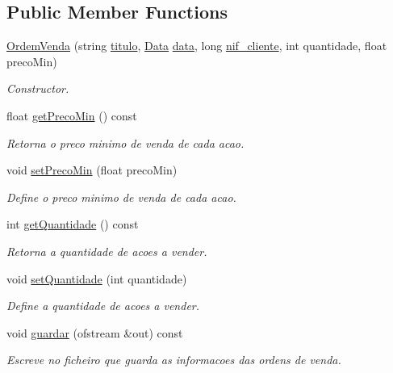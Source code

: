 \subsection*{Public Member Functions}
\begin{DoxyCompactItemize}
\item 
\hyperlink{class_ordem_venda_a90290893a4a714fa7e1b15801a00a452}{Ordem\+Venda} (string \hyperlink{class_ordem_a0773861bd9fb956d5ec62f2ef1de658b}{titulo}, \hyperlink{class_data}{Data} \hyperlink{class_ordem_a9f4dbc2966e98dcbd7e300ae346d8535}{data}, long \hyperlink{class_ordem_af6d06b4250735ae531bdcef5fa332f02}{nif\+\_\+cliente}, int quantidade, float preco\+Min)
\begin{DoxyCompactList}\small\item\em Constructor. \end{DoxyCompactList}\item 
float \hyperlink{class_ordem_venda_a4ebbecbc2fabdeb2f9e6af44c47bd176}{get\+Preco\+Min} () const
\begin{DoxyCompactList}\small\item\em Retorna o preco minimo de venda de cada acao. \end{DoxyCompactList}\item 
void \hyperlink{class_ordem_venda_a5b1ae919558cb5cd7bc892e505abf630}{set\+Preco\+Min} (float preco\+Min)
\begin{DoxyCompactList}\small\item\em Define o preco minimo de venda de cada acao. \end{DoxyCompactList}\item 
int \hyperlink{class_ordem_venda_a0c87b42f245049a1b01f414e508b5692}{get\+Quantidade} () const
\begin{DoxyCompactList}\small\item\em Retorna a quantidade de acoes a vender. \end{DoxyCompactList}\item 
void \hyperlink{class_ordem_venda_a44040292fc692df291cc909d486031de}{set\+Quantidade} (int quantidade)
\begin{DoxyCompactList}\small\item\em Define a quantidade de acoes a vender. \end{DoxyCompactList}\item 
void \hyperlink{class_ordem_venda_a3d6f78188308caac122209e68287e09f}{guardar} (ofstream \&out) const
\begin{DoxyCompactList}\small\item\em Escreve no ficheiro que guarda as informacoes das ordens de venda. \end{DoxyCompactList}\end{DoxyCompactItemize}
